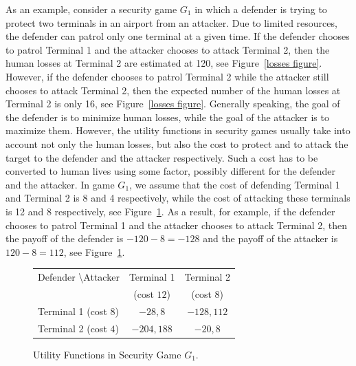 \documentclass[letterpaper]{article}
\begin{document}
As an example, consider a security game $G_1$ in which a defender is trying to protect two terminals in an airport from an attacker. Due to limited resources, the defender can patrol only one terminal at a given time. If the defender chooses to patrol Terminal 1 and the attacker chooses to attack Terminal 2, then the human losses at Terminal 2 are estimated at 120, see Figure~\ref{losses figure}. However, if the defender chooses to patrol Terminal 2 while the attacker still chooses to attack Terminal 2, then the expected number of the human losses at Terminal 2 is only 16, see Figure~\ref{losses figure}. Generally speaking, the goal of the defender is to minimize human losses, while the goal of the attacker is to maximize them. However, the utility functions in security games usually take into account not only the human losses, but also the cost to protect and to attack the target to the defender and the attacker respectively. Such a cost has to be converted to human lives using some factor, possibly different for the defender and the attacker. In game $G_1$, we assume that the cost of defending Terminal 1 and Terminal 2 is 8 and 4 respectively, while the cost of attacking these terminals is 12 and 8 respectively, see Figure~\ref{utility figure}.  As a result, for example, if the defender chooses to patrol Terminal 1 and the attacker chooses to attack Terminal 2, then the payoff of the defender is $-120-8=-128$ and the payoff of the attacker is $120-8=112$, see Figure~\ref{utility figure}.   

\begin{figure}[ht]
\begin{center}
\renewcommand{\arraystretch}{1.3}
\begin{tabular}{ l | c  c }
Defender \textbackslash Attacker  & Terminal 1 & Terminal 2  \\ [-1ex]
                                & (cost $12$) & (cost $8$)\\ \hline
 Terminal 1 (cost $8$) & $-28,8$ & $-128,112$ \\
 Terminal 2 (cost $4$) & $-204,188$ &  $-20,8$  
\end{tabular}
\caption{Utility Functions in Security Game $G_1$.}\label{utility figure}
\end{center}
\end{figure}
\end{document}
